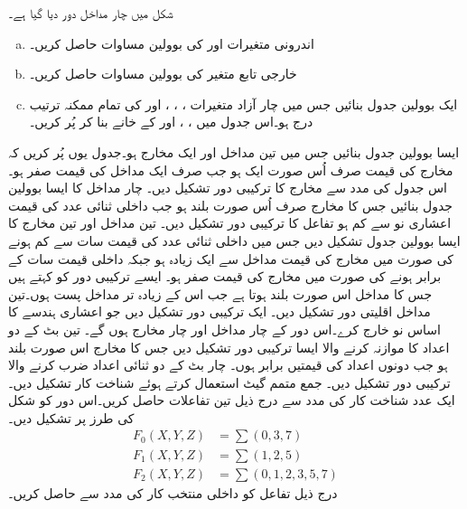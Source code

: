 شکل  میں چار مداخل  دور دیا گیا ہے۔
\begin{enumerate}[a.]
\item
اندرونی متغیرات   اور کی بوولین مساوات  حاصل  کریں۔
\item
 خارجی تابع متغیر  کی بوولین مساوات حاصل کریں۔
\item
ایک بوولین جدول بنائیں جس میں چار آزاد متغیرات ، ،  ،  اور  کی تمام  ممکنہ ترتیب درج ہو۔اس جدول میں ، ،  اور  کے خانے بنا کر پُر کریں۔ 
\end{enumerate}
 ایسا بوولین جدول بنائیں جس  میں تین مداخل اور ایک مخارج ہو۔جدول  یوں پُر کریں کہ مخارج کی قیمت صرف اُس صورت ایک   ہو جب صرف  ایک مداخل کی قیمت صفر    ہو۔اس جدول کی مدد سے مخارج کا ترکیبی دور تشکیل دیں۔
چار مداخل کا  ایسا بوولین جدول بنائیں جس کا مخارج صرف اُس   صورت بلند ہو جب  داخلی ثنائی عدد کی قیمت اعشاری  نو   سے  کم ہو تفاعل کا ترکیبی دور تشکیل دیں۔ 
تین مداخل اور تین مخارج  کا ایسا بوولین جدول تشکیل دیں جس میں  داخلی ثنائی عدد کی قیمت سات   سے کم ہونے کی صورت میں مخارج کی قیمت مداخل سے ایک زیادہ  ہو  جبکہ  داخلی قیمت سات کے برابر ہونے کی صورت میں مخارج کی قیمت صفر   ہو۔
 ایسے ترکیبی دور کو کہتے ہیں جس کا مداخل اس صورت بلند ہوتا ہے جب اس کے زیادہ تر مداخل پست ہوں۔تین  مداخل  اقلیتی دور تشکیل دیں۔
ایک ترکیبی دور تشکیل دیں جو اعشاری ہندسے کا اساس نو خارج  کرے۔اس دور کے چار مداخل اور چار مخارج ہوں گے۔
 تین بٹ کے دو اعداد کا موازنہ کرنے والا ایسا ترکیبی دور تشکیل دیں  جس کا مخارج اس صورت بلند ہو جب دونوں اعداد کی قیمتیں  برابر ہوں۔
 چار بٹ کے دو ثنائی اعداد ضرب کرنے والا ترکیبی دور تشکیل دیں۔
 جمع متمم گیٹ استعمال کرتے ہوئے  شناخت کار تشکیل دیں۔
ایک عدد   شناخت کار کی مدد سے   درج ذیل تین تفاعلات حاصل کریں۔اس دور کو شکل  کی طرز پر تشکیل دیں۔
\begin{align*}
F_0(X,Y,Z)&=\sum(0,3,7)\\
F_1(X,Y,Z)&=\sum(1,2,5)\\
F_2(X,Y,Z)&=\sum(0,1,2,3,5,7)
\end{align*}
 درج ذیل تفاعل کو   داخلی منتخب کار کی مدد سے حاصل  کریں۔
